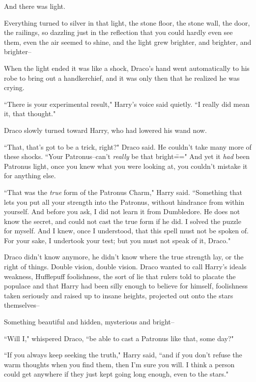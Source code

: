 And there was light.

Everything turned to silver in that light, the stone floor, the stone wall, the door, the railings, so dazzling just in the reflection that you could hardly even see them, even the air seemed to shine, and the light grew brighter, and brighter, and brighter\---

When the light ended it was like a shock, Draco's hand went automatically to his robe to bring out a handkerchief, and it was only then that he realized he was crying.

``There is your experimental result," Harry's voice said quietly. ``I really did mean it, that thought."

Draco slowly turned toward Harry, who had lowered his wand now.

``That, that's got to be a trick, right?" Draco said. He couldn't take many more of these shocks. ``Your Patronus\---can't \emph{really} be that bright\===" And yet it \emph{had} been Patronus light, once you knew what you were looking at, you couldn't mistake it for anything else.

``That was the \emph{true} form of the Patronus Charm," Harry said. ``Something that lets you put all your strength into the Patronus, without hindrance from within yourself. And before you ask, I did not learn it from Dumbledore. He does not know the secret, and could not cast the true form if he did. I solved the puzzle for myself. And I knew, once I understood, that this spell must not be spoken of. For your sake, I undertook your test; but you must not speak of it, Draco."

Draco didn't know anymore, he didn't know where the true strength lay, or the right of things. Double vision, double vision. Draco wanted to call Harry's ideals weakness, Hufflepuff foolishness, the sort of lie that rulers told to placate the populace and that Harry had been silly enough to believe for himself, foolishness taken seriously and raised up to insane heights, projected out onto the stars themselves\---

Something beautiful and hidden, mysterious and bright\---

``Will I," whispered Draco, ``be able to cast a Patronus like that, some day?"

``If you always keep seeking the truth," Harry said, ``and if you don't refuse the warm thoughts when you find them, then I'm sure you will. I think a person could get anywhere if they just kept going long enough, even to the stars."

